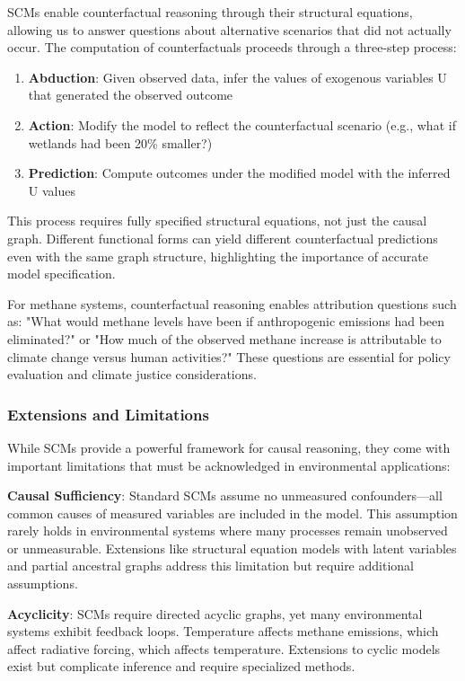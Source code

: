 SCMs enable counterfactual reasoning through their structural equations, allowing us to answer questions about alternative scenarios that did not actually occur. The computation of counterfactuals proceeds through a three-step process:

\begin{enumerate}
	\item \textbf{Abduction}: Given observed data, infer the values of exogenous variables U that generated the observed outcome
	\item \textbf{Action}: Modify the model to reflect the counterfactual scenario (e.g., what if wetlands had been 20\% smaller?)
	\item \textbf{Prediction}: Compute outcomes under the modified model with the inferred U values
\end{enumerate}

This process requires fully specified structural equations, not just the causal graph. Different functional forms can yield different counterfactual predictions even with the same graph structure, highlighting the importance of accurate model specification.

For methane systems, counterfactual reasoning enables attribution questions such as: "What would methane levels have been if anthropogenic emissions had been eliminated?" or "How much of the observed methane increase is attributable to climate change versus human activities?" These questions are essential for policy evaluation and climate justice considerations.

\subsubsection{Extensions and Limitations}

While SCMs provide a powerful framework for causal reasoning, they come with important limitations that must be acknowledged in environmental applications:

\textbf{Causal Sufficiency}: Standard SCMs assume no unmeasured confounders—all common causes of measured variables are included in the model. This assumption rarely holds in environmental systems where many processes remain unobserved or unmeasurable. Extensions like structural equation models with latent variables and partial ancestral graphs address this limitation but require additional assumptions.

\textbf{Acyclicity}: SCMs require directed acyclic graphs, yet many environmental systems exhibit feedback loops. Temperature affects methane emissions, which affect radiative forcing, which affects temperature. Extensions to cyclic models exist but complicate inference and require specialized methods.

